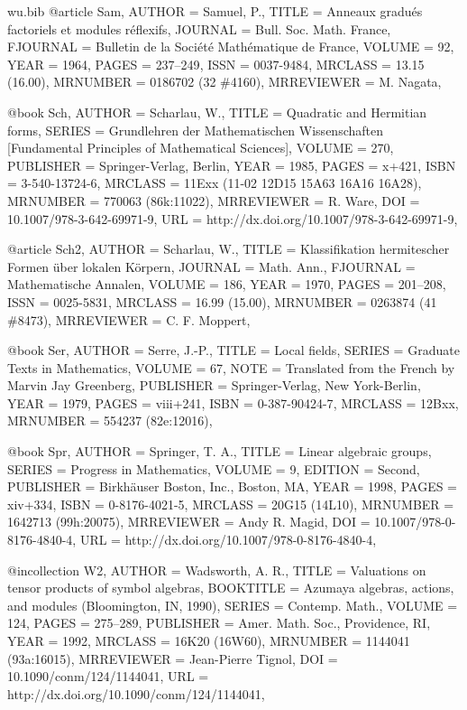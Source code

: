 \documentclass{amsart}
\numberwithin{equation}{section}
\theoremstyle{plain}
\theoremstyle{definition}
\begin{document}
\begin{filecontents}{wu.bib}
@article {Sam, 
    AUTHOR = {Samuel, P.},
     TITLE = {Anneaux gradu\'es factoriels et modules r\'eflexifs},
   JOURNAL = {Bull. Soc. Math. France},
  FJOURNAL = {Bulletin de la Soci\'et\'e Math\'ematique de France},
    VOLUME = {92},
      YEAR = {1964},
     PAGES = {237--249},
      ISSN = {0037-9484},
   MRCLASS = {13.15 (16.00)},
  MRNUMBER = {0186702 (32 \#4160)},
MRREVIEWER = {M. Nagata},
}

@book {Sch, 
    AUTHOR = {Scharlau, W.},
     TITLE = {Quadratic and {H}ermitian forms},
    SERIES = {Grundlehren der Mathematischen Wissenschaften [Fundamental
              Principles of Mathematical Sciences]},
    VOLUME = {270},
 PUBLISHER = {Springer-Verlag, Berlin},
      YEAR = {1985},
     PAGES = {x+421},
      ISBN = {3-540-13724-6},
   MRCLASS = {11Exx (11-02 12D15 15A63 16A16 16A28)},
  MRNUMBER = {770063 (86k:11022)},
MRREVIEWER = {R. Ware},
       DOI = {10.1007/978-3-642-69971-9},
       URL = {http://dx.doi.org/10.1007/978-3-642-69971-9},
}

@article {Sch2, 
    AUTHOR = {Scharlau, W.},
     TITLE = {Klassifikation hermitescher {F}ormen \"uber lokalen
              {K}\"orpern},
   JOURNAL = {Math. Ann.},
  FJOURNAL = {Mathematische Annalen},
    VOLUME = {186},
      YEAR = {1970},
     PAGES = {201--208},
      ISSN = {0025-5831},
   MRCLASS = {16.99 (15.00)},
  MRNUMBER = {0263874 (41 \#8473)},
MRREVIEWER = {C. F. Moppert},
}

@book {Ser, 
    AUTHOR = {Serre, J.-P.},
     TITLE = {Local fields},
    SERIES = {Graduate Texts in Mathematics},
    VOLUME = {67},
      NOTE = {Translated from the French by Marvin Jay Greenberg},
 PUBLISHER = {Springer-Verlag, New York-Berlin},
      YEAR = {1979},
     PAGES = {viii+241},
      ISBN = {0-387-90424-7},
   MRCLASS = {12Bxx},
  MRNUMBER = {554237 (82e:12016)},
}

@book {Spr,
    AUTHOR = {Springer, T. A.},
     TITLE = {Linear algebraic groups},
    SERIES = {Progress in Mathematics},
    VOLUME = {9},
   EDITION = {Second},
 PUBLISHER = {Birkh\"auser Boston, Inc., Boston, MA},
      YEAR = {1998},
     PAGES = {xiv+334},
      ISBN = {0-8176-4021-5},
   MRCLASS = {20G15 (14L10)},
  MRNUMBER = {1642713 (99h:20075)},
MRREVIEWER = {Andy R. Magid},
       DOI = {10.1007/978-0-8176-4840-4},
       URL = {http://dx.doi.org/10.1007/978-0-8176-4840-4},
}

@incollection {W2, 
    AUTHOR = {Wadsworth, A. R.},
     TITLE = {Valuations on tensor products of symbol algebras},
 BOOKTITLE = {Azumaya algebras, actions, and modules ({B}loomington, {IN},
              1990)},
    SERIES = {Contemp. Math.},
    VOLUME = {124},
     PAGES = {275--289},
 PUBLISHER = {Amer. Math. Soc., Providence, RI},
      YEAR = {1992},
   MRCLASS = {16K20 (16W60)},
  MRNUMBER = {1144041 (93a:16015)},
MRREVIEWER = {Jean-Pierre Tignol},
       DOI = {10.1090/conm/124/1144041},
       URL = {http://dx.doi.org/10.1090/conm/124/1144041},
}


\end{filecontents}
\end{document}
